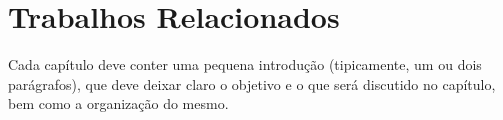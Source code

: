
\chapter{Trabalhos Relacionados}
\label{chap_trabalhos_relacionados}

Cada capítulo deve conter uma pequena introdução (tipicamente, um ou dois parágrafos), que deve deixar claro o objetivo e o que será discutido no capítulo, bem como a organização do mesmo.
